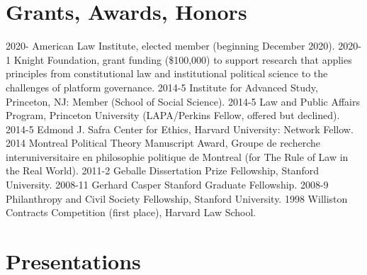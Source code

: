 \documentclass[letterpaper]{moderncv}
\begin{document}
\section{Grants, Awards, Honors}
\cvitem
{2020-}
{American Law Institute, elected member (beginning December 2020).}
\vspace{1mm}
\cvitem
{2020-1}
{Knight Foundation, grant funding (\$100,000) to support research that applies principles from constitutional law and institutional political science to the challenges of platform governance.}
\vspace{1mm}
\cvitem
{2014-5}
{Institute for Advanced Study, Princeton, NJ: Member (School of Social Science).}
\vspace{1mm}
\cvitem
{2014-5}
{Law and Public Affairs Program, Princeton University (LAPA/Perkins Fellow, offered but declined).}
\vspace{1mm}
\cvitem
{2014-5}
{Edmond J. Safra Center for Ethics, Harvard University: Network Fellow.}
\vspace{1mm}
\cvitem
{2014}
{Montreal Political Theory Manuscript Award, Groupe de recherche interuniversitaire en philosophie politique de Montreal (for The Rule of Law in the Real World).}
\vspace{1mm}
\cvitem
{2011-2}
{Geballe Dissertation Prize Fellowship, Stanford University.}
\vspace{1mm}
\cvitem
{2008-11}
{Gerhard Casper Stanford Graduate Fellowship.}
\vspace{1mm}
\cvitem
{2008-9}
{Philanthropy and Civil Society Fellowship, Stanford University.}
\vspace{1mm}
\cvitem
{1998}
{Williston Contracts Competition (first place), Harvard Law School.}
\vspace{1mm}


\section{Presentations}
\end{document}
